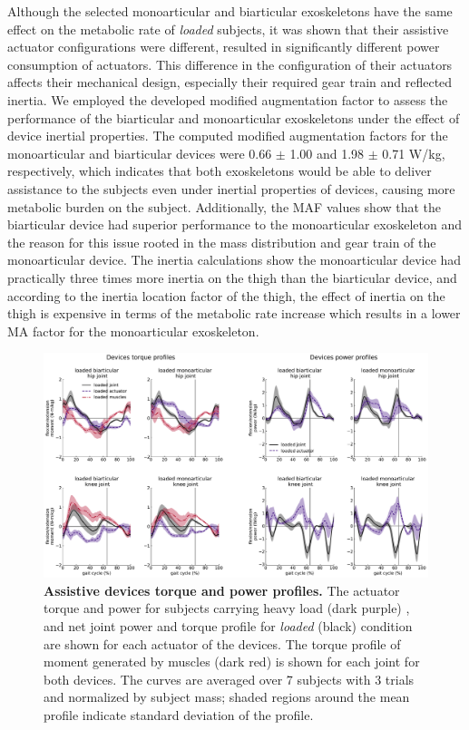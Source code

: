 \documentclass[10pt,letterpaper]{article}
\begin{document}
Although the selected monoarticular and biarticular exoskeletons have the same effect on the metabolic rate of {\it loaded} subjects, it was shown that their assistive actuator configurations were different, resulted in significantly different power consumption of actuators. This difference in the configuration of their actuators affects their mechanical design, especially their required gear train and reflected inertia. We employed the developed modified augmentation factor to assess the performance of the biarticular and monoarticular exoskeletons under the effect of device inertial properties. The computed modified augmentation factors for the monoarticular and biarticular devices were 0.66 $\pm$ 1.00 and  1.98 $\pm$ 0.71 W/kg, respectively, which indicates that both exoskeletons would be able to deliver assistance to the subjects even under inertial properties of devices, causing more metabolic burden on the subject. Additionally, the MAF values show that the biarticular device had superior performance to the monoarticular exoskeleton and the reason for this issue rooted in the mass distribution and gear train of the monoarticular device. The inertia calculations show the monoarticular device had practically three times more inertia on the thigh than the biarticular device, and according to the inertia location factor of the thigh, the effect of inertia on the thigh is expensive in terms of the metabolic rate increase which results in a lower MA factor for the monoarticular exoskeleton.\\
\begin{figure}[ht]   
	\centering
	\includegraphics[width=\linewidth]{Case_Studies/LoadedMono04_LoadedBi16/PaperFigure_Profiles.pdf}
	\vspace{1mm}
	\caption{{\small\textbf{Assistive devices torque and power profiles.} The actuator torque and power for subjects carrying heavy load (dark purple) , and net joint power and torque profile for \textit{loaded} (black) condition are shown for each actuator of the devices. The torque profile of moment generated by muscles (dark red) is shown for each joint for both devices. The curves are averaged over 7 subjects with 3 trials and normalized by subject mass; shaded regions around the mean profile indicate standard deviation of the profile.}}
	\label{Fig_Case01_Torque_Power_Profiles}
\end{figure}
\end{document}

